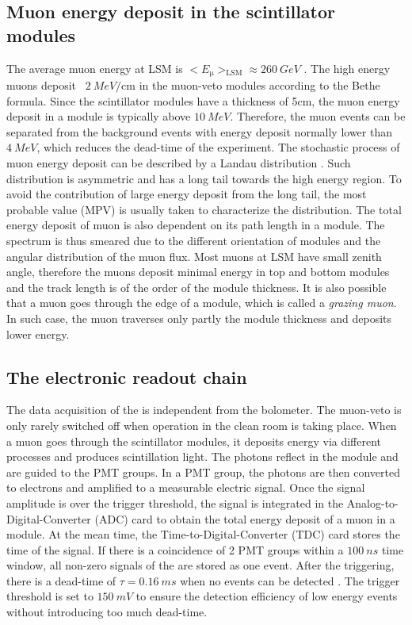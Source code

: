 \subsection{Muon energy deposit in the scintillator modules}
The average muon energy at LSM is $<E_{\upmu}>_{\mathrm{LSM}}\approx \SI{260}{GeV}$ \cite{Klu13}. The high energy muons deposit ~$\SI{2}{MeV\per\cm}$ in the muon-veto modules according to the Bethe formula. Since the scintillator modules have a thickness of 5cm, the muon energy deposit in a module is typically above $\SI{10}{MeV}$. Therefore, the muon events can be separated from the background events with energy deposit normally lower than $\SI{4}{MeV}$, which reduces the dead-time of the experiment.
The stochastic process of muon energy deposit can be described by a Landau distribution \cite{Lan44}. Such distribution is asymmetric and has a long tail towards the high energy region. To avoid the contribution of large energy deposit from the long tail, the most probable value (MPV) is usually taken to characterize the distribution.
The total energy deposit of muon is also dependent on its path length in a module. The spectrum is thus smeared due to the different orientation of modules and the angular distribution of the muon flux. Most muons at LSM have small zenith angle, therefore the muons deposit minimal energy in top and bottom modules and the track length is of the order of the module thickness.
It is also possible that a muon goes through the edge of a module, which is called a \textit{grazing muon}. In such case, the muon traverses only partly the module thickness and deposits lower energy.

\subsection{The electronic readout chain}
The data acquisition of the \mvs{} is independent from the bolometer. The muon-veto is only rarely switched off when operation in the clean room is taking place.
When a muon goes through the scintillator modules, it deposits energy via different processes and produces scintillation light. The photons reflect in the module and are guided to the PMT groups. In a PMT group, the photons are then converted to electrons and amplified to a measurable electric signal. Once the signal amplitude is over the trigger threshold, the signal is integrated in the Analog-to-Digital-Converter (ADC) card to obtain the total energy deposit of a muon in a module. At the mean time, the Time-to-Digital-Converter (TDC) card stores the time of the signal. If there is a coincidence of 2 PMT groups within a $\SI{100}{ns}$ time window, all non-zero signals of the \mvs{} are stored as one event. After the triggering, there is a dead-time of $\tau=\SI{0.16}{ms}$ when no events can be detected \cite{Sch13b}. The trigger threshold is set to $\SI{150}{mV}$ to ensure the detection efficiency of low energy events without introducing too much dead-time.

